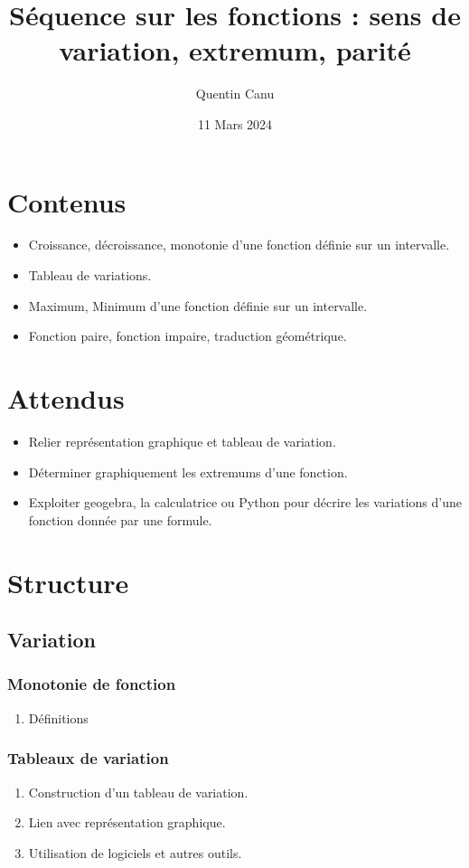 \documentclass{article}
\title{Séquence sur les fonctions : sens de variation, extremum, parité}
\author{Quentin Canu}
\date{11 Mars 2024}
\begin{document}
\maketitle
\section{Contenus}
\begin{itemize}
\item Croissance, décroissance, monotonie d'une fonction définie sur un intervalle.
\item Tableau de variations.
\item Maximum, Minimum d'une fonction définie sur un intervalle.
\item Fonction paire, fonction impaire, traduction géométrique. 
\end{itemize}
\section{Attendus}
\begin{itemize}
\item Relier représentation graphique et tableau de variation.
\item Déterminer graphiquement les extremums d'une fonction.
\item Exploiter geogebra, la calculatrice ou Python pour décrire les variations d'une fonction donnée par une formule.
\end{itemize}
\section{Structure}
\subsection{Variation}
\subsubsection{Monotonie de fonction}
\begin{enumerate}
\item Définitions 
\end{enumerate}
\subsubsection{Tableaux de variation}
\begin{enumerate}
\item Construction d'un tableau de variation.
\item Lien avec représentation graphique.
\item Utilisation de logiciels et autres outils.
\end{enumerate}
\end{document}
